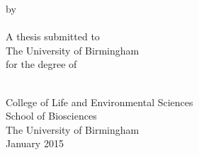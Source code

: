\documentclass[a4paper, 12pt, oneside]{report}
\begin{document}
\doublespacing





\begin{titlepage}

	\vspace*{0.1in}
	\begin{singlespace}
		\begin{center}
			\begin{doublespace}
			{\Huge{}}
			\end{doublespace}
			\vspace{0.5in}
			by\\
			\vspace{0.5in}
			{\Large{}}\\
			\vspace{1.5in}
			A thesis submitted to\\
			The University of Birmingham\\
			for the degree of\\
			{}\\
		\end{center}

		\vfill

		\hfill
		\parbox{3in}{College of Life and Environmental Sciences\\
			School of Biosciences\\
			The University of Birmingham\\
			January 2015}
	\end{singlespace}

\end{titlepage}


\pagestyle{plain}
\setcounter{page}{1}






\clearpage
\thispagestyle{plain}
\par{}
\end{document}
